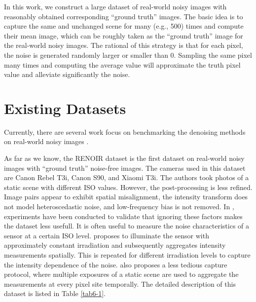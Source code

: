 In this work, we construct a large dataset of real-world noisy images with reasonably obtained corresponding ``ground truth'' images. The basic idea is to capture the same and unchanged scene for many (e.g., 500) times and compute their mean image, which can be roughly taken as the ``ground truth'' image for the real-world noisy images. The rational of this strategy is that for each pixel, the noise is generated randomly larger or smaller than 0. Sampling the same pixel many times and computing the average value will approximate the truth pixel value and alleviate significantly the noise.

\section{Existing Datasets}

Currently, there are several work focus on benchmarking the denoising methods on real-world noisy images \cite{RENOIR2014,crosschannel2016,dnd2017}.

As far as we know, the RENOIR dataset \cite{RENOIR2014} is the first dataset on real-world noisy images with ``ground truth'' noise-free images. The cameras used in this dataset are Canon Rebel T3i, Canon S90, and Xiaomi T3i. The authors took photos of a static scene with different ISO values. However, the post-processing is less refined. Image pairs appear to exhibit spatial misalignment, the intensity transform does not model heteroscedastic noise, and low-frequency bias is not removed. In \cite{RENOIR2014}, experiments have been conducted to validate that ignoring these factors makes the dataset less usefull. It is often useful to measure the noise characteristics of a sensor at a certain ISO level. \cite{RENOIR2014} proposes to illuminate the sensor with approximately constant irradiation and subsequently aggregates intensity measurements spatially. This is repeated for different irradiation levels to capture the intensity dependence of the noise. \cite{RENOIR2014} also proposes a less tedious capture protocol, where multiple exposures of a static scene are used to aggregate the measurements at every pixel site temporally. The detailed description of this dataset is listed in Table \ref{tab6-1}.

